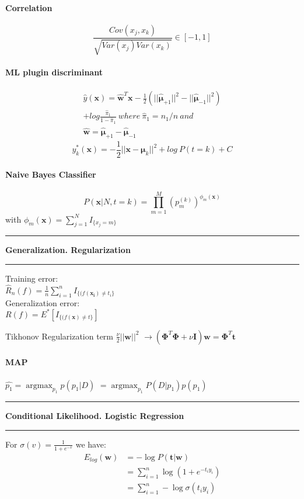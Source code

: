 \documentclass[7pt]{scrartcl}
\newlength{\secskip}
\renewcommand{\section}[1]{
  \vspace{\secskip}
  \hrule\vspace{.3em}
  \textbf{#1}
  \vspace{.3em}
  \hrule
  \vspace{\secskip}
}
\DeclareMathOperator*{\argmax}{argmax}
\renewcommand{\vec}{\mathbf}
\begin{document}
\begin{multicols}{4}
\paragraph{Correlation}
\[\frac{Cov(x_j,x_k)}{\sqrt{Var(x_j)Var(x_k)}} \in [-1,1]\]

\paragraph{ML plugin discriminant}
\begin{equation*}
\begin{split}
\hat{y}(\vec{x}) = \hat{\vec{w}}^T \vec{x} - \frac{1}{2}(||\hat{\vec{\mu}}_{+1} ||^2 - || \hat{\vec{\mu}}_{-1} ||^2) \\ + log\frac{\hat{\pi}_1}{1-\hat{\pi}_1} ~ where~ \hat{\pi}_1 = n_1 / n ~ and~  \\ \hat{\vec{w}}=\hat{\vec{\mu}}_{+1} - \hat{\vec{\mu}}_{-1}
\end{split}
\end{equation*}
\[y_k^*(\vec{x}) = -\frac{1}{2}||\vec{x}-\vec{\mu}_k||^2 + log~P(t=k) + C\]

\paragraph{Naive Bayes Classifier}
\[ P(\vec x | N,t=k) = \prod_{m=1}^M \left ( p_m^{(k)} \right
)^{\phi_m(\vec x)} \]
with $\phi_m(\vec x) = \sum_{j=1}^N I_{\{x_j = m\}}$

\section{Generalization. Regularization}
Training error: \\
$\hat{R}_n(f) = \frac{1}{n} \sum_{i=1}^n I_{\{(f(\vec{x_i}) \neq t_i\}}$ \\
Generalization error: \\
$R(f) = E^*[I_{\{(f(\vec{x}) \neq t\}}]$

Tikhonov Regularization term $\frac{\nu}{2} ||\vec{w}||^2$
$\rightarrow (\vec{\Phi}^T \vec{\Phi} + \nu \vec{I})\vec{w} = \vec{\Phi}^T \vec{t}$

\paragraph{MAP}
$\hat{p_1} = \argmax_{p_1} p(p_1|D)$
$= \argmax_{p_1} P(D|p_1)p(p_1)$
\section{Conditional Likelihood. Logistic Regression}
For $\sigma(v) = \frac{1}{1+e^{-v}}$ we have:
\begin{align*}
 E_{log}(\vec w) &= - \log P(\vec t | \vec w)\\
 &= \sum\nolimits_{i=1}^n \log \left (1 + e^{-t_iy_i} \right)\\
 &= \sum\nolimits_{i=1}^n -\log \sigma (t_iy_i)
\end{align*}

\end{multicols}
\end{document}
